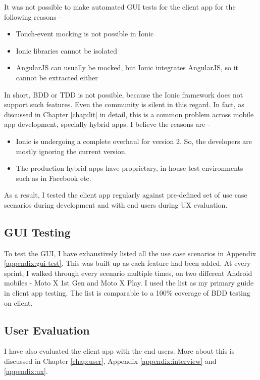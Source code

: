 It was not possible to make automated GUI tests for the client app for the following reasons - 

\begin{itemize}
	\item Touch-event mocking is not possible in Ionic
	\item Ionic libraries cannot be isolated
	\item AngularJS can usually be mocked, but Ionic integrates AngularJS, so it cannot be extracted either
\end{itemize}

In short, BDD or TDD is not possible, because the Ionic framework does not support such features. Even the community is silent in this regard. In fact, as discussed in Chapter \ref{chap:lit} in detail, this is a common problem across mobile app development, specially hybrid apps. I believe the reasons are - 

\begin{itemize}
	\item Ionic is undergoing a complete overhaul for version 2. So, the developers are mostly ignoring the current version.
	\item The production hybrid apps have proprietary, in-house test environments such as in Facebook etc.
\end{itemize}

As a result, I tested the client app regularly against pre-defined set of use case scenarios during development and with end users during UX evaluation.

\subsection{GUI Testing}

To test the GUI, I have exhaustively listed all the use case scenarios in Appendix \ref{appendix:gui-test}. This was built up as each feature had been added. At every sprint, I walked through every scenario multiple times, on two different Android mobiles - Moto X 1st Gen and Moto X Play. I used the list as my primary guide in client app testing. The list is comparable to a 100\% coverage of BDD testing on client.


\subsection{User Evaluation}

I have also evaluated the client app with the end users. More about this is discussed in Chapter \ref{chap:user}, Appendix \ref{appendix:interview} and \ref{appendix:ux}.